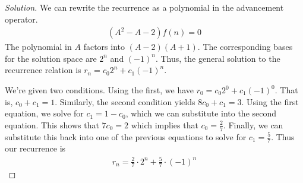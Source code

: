 \documentclass[12pt]{article}
\theoremstyle{definition}
\newenvironment{solution}{
  \begin{proof}[Solution]
    \vspace{-8px}
    \setlength{\parskip}{4px}
    \setlength{\parindent}{0px}
}{
\end{proof}
}
\begin{document}
  \begin{solution}
    We can rewrite the recurrence as a polynomial in the advancement operator.
    \begin{align*}
      (A^{2} - A - 2) f(n) = 0
    \end{align*}
    The polynomial in \(A\) factors into \((A - 2)(A + 1)\).
    The corresponding bases for the solution space are \(2^{n}\) and \((-1)^{n}\).
    Thus, the general solution to the recurrence relation is \(r_{n} = c_{0}2^{n} + c_{1}(-1)^n\).

    We're given two conditions. Using the first, we have \(r_{0} = c_{0}2^{0} + c_{1}(-1)^{0}\).
    That is, \(c_{0} + c_{1} = 1\). Similarly, the second condition yields \(8c_{0} + c_{1} = 3\).
    Using the first equation, we solve for \(c_{1} = 1 - c_{0}\), which we can substitute into the second equation.
    This shows that \(7c_{0} = 2 \) which implies that \(c_{0} = \frac{2}{7}\).
    Finally, we can substitute this back into one of the previous equations to solve for \(c_{1} = \frac{5}{7}\). Thus our recurrence is
    \begin{align*}
      r_{n} = \frac{2}{7} \cdot 2^{n} + \frac{5}{7} \cdot (-1)^{n}
    \end{align*}
  \end{solution}
\end{document}
